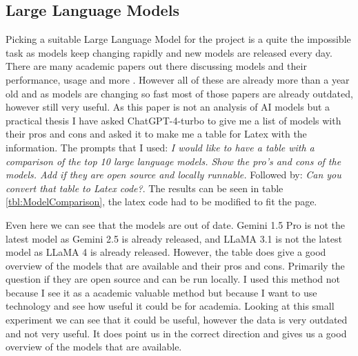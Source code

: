 \subsection{Large Language Models}

Picking a suitable Large Language Model for the project is a quite the impossible task as models keep changing rapidly and new models are released every day. There are many academic papers out there discussing models and their performance, usage and more \cite{2024arXiv240201687A,chang2024survey,hadi2023survey,zhao2023survey}. However all of these are already more than a year old and as models are changing so fast most of those papers are already outdated, however still very useful. As this paper is not an analysis of AI models but a practical thesis I have asked ChatGPT-4-turbo to give me a list of models with their pros and cons and asked it to make me a table for Latex with the information. The prompts that I used: \textit{I would like to have a table with a comparison of the top 10 large language models. Show the pro's and cons of the models. Add if they are open source and locally runnable.} Followed by: \textit{Can you convert that table to Latex code?}. The results can be seen in table \ref{tbl:ModelComparison}, the latex code had to be modified to fit the page.

Even here we can see that the models are out of date. Gemini 1.5 Pro is not the latest model as Gemini 2.5 is already released, and LLaMA 3.1 is not the latest model as LLaMA 4 is already released. However, the table does give a good overview of the models that are available and their pros and cons. Primarily the question if they are open source and can be run locally. I used this method not because I see it as a academic valuable method but because I want to use technology and see how useful it could be for academia. Looking at this small experiment we can see that it could be useful, however the data is very outdated and not very useful. It does point us in the correct direction and gives us a good overview of the models that are available.

